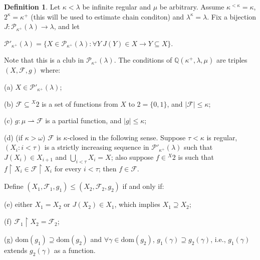 \documentclass[10pt,reqno]{amsart}
\theoremstyle{plain}
\theoremstyle{definition}
\newtheorem{definition}[theorem]{Definition}
\theoremstyle{remark}
\begin{document}
\begin{definition}
Let $\kappa<\lambda$ be infinite regular and $\mu$ be arbitrary. Assume $\kappa^{<\kappa}=\kappa$, $2^\kappa=\kappa^+$ (this will be used to estimate chain conditon) and $\lambda^\kappa=\lambda$. Fix a bijection $J:\mathcal{P}_{\kappa^+}(\lambda)\rightarrow\lambda$, and let 


\begin{center}
$\mathcal{P}'_{\kappa^+}(\lambda)=\{X\in\mathcal{P}_{\kappa^+}(\lambda):\forall Y\ J(Y)\in X\rightarrow Y\subseteq X\}$.
\end{center}


Note that this is a club in $\mathcal{P}_{\kappa^+}(\lambda)$. The conditions of $\mathbb{Q}(\kappa^+,\lambda,\mu)$ are triples $(X,\mathcal{F},g)$ where:

(a) $X\in\mathcal{P}'_{\kappa^+}(\lambda)$;

(b) $\mathcal{F}\subseteq {}^{X}2$ is a set of functions from $X$ to $2=\{0,1\}$, and $|\mathcal{F}|\leq\kappa$;

(c) $g:\mu\rightharpoonup\mathcal{F}$ is a partial function, and $|g|\leq\kappa$;

(d) (if $\kappa>\omega$) $\mathcal{F}$ is $\kappa$-closed in the following sense. Suppose $\tau<\kappa$ is regular, $(X_i:i<\tau)$ is a strictly increasing sequence in $\mathcal{P}'_{\kappa^+}(\lambda)$ such that $J(X_i)\in X_{i+1}$ and $\bigcup_{i<\tau}X_i=X$; also suppose $f\in {}^{X}2$ is such that $f\upharpoonright X_i\in\mathcal{F}\upharpoonright X_i$ for every $i<\tau$; then $f\in\mathcal{F}$.

Define $(X_1,\mathcal{F}_1,g_1)\leq(X_2,\mathcal{F}_2,g_2)$ if and only if:

(e) either $X_1=X_2$ or $J(X_2)\in X_1$, which implies $X_1\supseteq X_2$;

(f) $\mathcal{F}_1\upharpoonright X_2=\mathcal{F}_2$;

(g) $\mathrm{dom}(g_1)\supseteq\mathrm{dom}(g_2)$ and $\forall\gamma\in\mathrm{dom}(g_2)$, $g_1(\gamma)\supseteq g_2(\gamma)$, i.e., $g_1(\gamma)$ extends $g_2(\gamma)$ as a function.
\end{definition}
\end{document}
